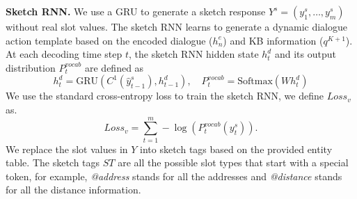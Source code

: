 \documentclass{article} \usepackage{iclr2019_conference,times}
\begin{document}
\textbf{Sketch RNN.}
We use a GRU to generate a sketch response $Y^s = (y^s_1,\dots,y^s_m)$ without real slot values. The sketch RNN learns to generate a dynamic dialogue action template based on the encoded dialogue ($h^e_n$) and KB information ($q^{K+1}$). At each decoding time step $t$, the sketch RNN hidden state $h^d_t$ and its output distribution $P^{vocab}_t$ are defined as
\begin{equation}
h^d_t = \text{GRU}(C^1(\hat{y}^s_{t-1}), h^d_{t-1}), \quad
P^{vocab}_t = \text{Softmax}(W h^d_t) 
\end{equation}
We use the standard cross-entropy loss to train the sketch RNN, we define $Loss_v$ as. 
\begin{equation}
Loss_v = \sum_{t=1}^{m} - \log(P^{vocab}_t(y^s_t)).
\end{equation}
We replace the slot values in $Y$ into sketch tags based on the provided entity table. The sketch tags $ST$ are all the possible slot types that start with a special token, for example, \textit{@address} stands for all the addresses and \textit{@distance} stands for all the distance information. 
\end{document}
